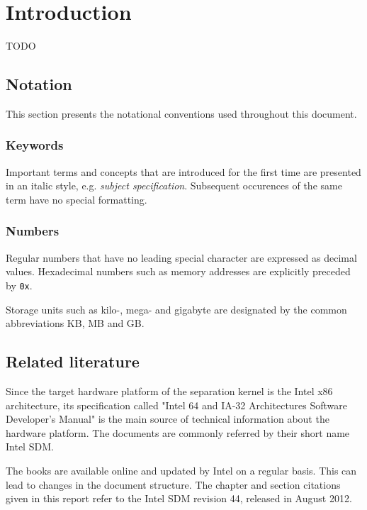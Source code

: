 \chapter{Introduction}
TODO

\section{Notation}
This section presents the notational conventions used throughout this document.

\subsection{Keywords}
Important terms and concepts that are introduced for the first time are
presented in an italic style, e.g. \emph{subject specification}. Subsequent
occurences of the same term have no special formatting.

\subsection{Numbers}
Regular numbers that have no leading special character are expressed as decimal
values. Hexadecimal numbers such as memory addresses are explicitly preceded by
\texttt{0x}.

Storage units such as kilo-, mega- and gigabyte are designated by the common
abbreviations KB, MB and GB.

\section{Related literature}
Since the target hardware platform of the separation kernel is the Intel x86
architecture, its specification called "Intel\textsuperscript{\textregistered}
64 and IA-32 Architectures Software Developer's Manual" \cite{IntelSDM} is the
main source of technical information about the hardware platform. The documents
are commonly referred by their short name Intel SDM.

The books are available online and updated by Intel on a regular basis. This
can lead to changes in the document structure. The chapter and section
citations given in this report refer to the Intel SDM revision 44, released in
August 2012.

